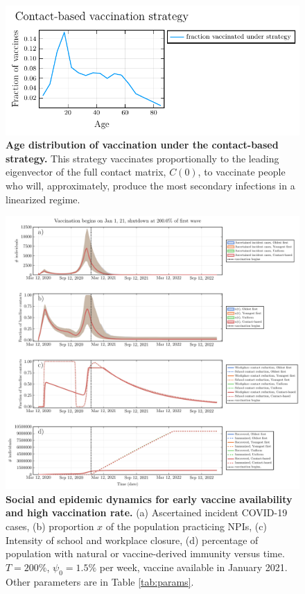     \begin{figure}[H]
    \centering
    \includegraphics[width = 12 cm]{appendices/FigureS6.pdf}
    \caption{\textbf{Age distribution of vaccination under the contact-based strategy.} This strategy vaccinates proportionally to the leading eigenvector of the full contact matrix, $C(0)$, to vaccinate people who will, approximately, produce the most secondary infections in a linearized regime.}
    \label{s6}
    \end{figure}
    
    \clearpage 
    
    \begin{figure}[H]
    \centering
    \includegraphics[width = 16 cm]{appendices/FigureS7.pdf}
    \caption{\textbf{Social and epidemic dynamics for early vaccine availability and high vaccination rate.} (a) Ascertained incident COVID-19 cases, (b) proportion $x$ of the population practicing NPIs, (c) Intensity of school and workplace closure, (d) percentage of population with natural or vaccine-derived immunity versus time. $T=200 \%$, $\psi_0=1.5 \%$ per week, vaccine available in January 2021.   Other parameters are in Table \ref{tab:params}.}
    \label{s7}
    \end{figure}
    
